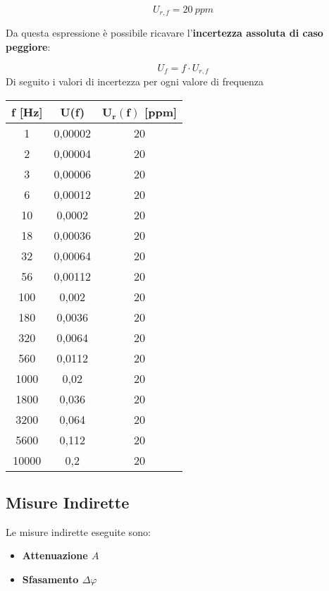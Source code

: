 \[U_{r,f} = 20 \ ppm\]

Da questa espressione è possibile ricavare l'\textbf{incertezza assoluta di caso peggiore}:

\[U_f = f \cdot U_{r,f}\]
Di seguito i valori di incertezza per ogni valore di frequenza 

\begin{table}[!ht]
    \centering
    \begin{tabular}{|c|c|c|}
    \hline
        \textbf{f [Hz]} & \textbf{U(f)} & $\bm{U_r(f)}$ [ppm] \\ \hline
        1 & 0,00002 & 20 \\ \hline
        2 & 0,00004 & 20 \\ \hline
        3 & 0,00006 & 20 \\ \hline
        6 & 0,00012 & 20 \\ \hline
        10 & 0,0002 & 20 \\ \hline
        18 & 0,00036 & 20 \\ \hline
        32 & 0,00064 & 20 \\ \hline
        56 & 0,00112 & 20 \\ \hline
        100 & 0,002 & 20 \\ \hline
        180 & 0,0036 & 20 \\ \hline
        320 & 0,0064 & 20 \\ \hline
        560 & 0,0112 & 20 \\ \hline
        1000 & 0,02 & 20 \\ \hline
        1800 & 0,036 & 20 \\ \hline
        3200 & 0,064 & 20 \\ \hline
        5600 & 0,112 & 20 \\ \hline
        10000 & 0,2 & 20 \\ \hline
    \end{tabular}
\end{table}

\FloatBarrier
\clearpage

\subsection{Misure Indirette}
Le misure indirette eseguite sono:
\begin{itemize}
    \item \textbf{Attenuazione $A$}
    \item \textbf{Sfasamento $\Delta \varphi$}
\end{itemize}

